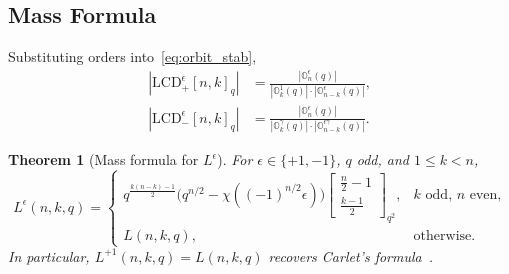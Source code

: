 \documentclass[11pt]{article}
\newcommand{\0}{\mathbf{0}}
\newcommand{\1}{\mathbf{1}}
\theoremstyle{plain}
\newtheorem{theorem}{Theorem}[section]
\theoremstyle{definition}
\theoremstyle{remark}
\begin{document}
\subsection{Mass Formula}

Substituting orders into~\eqref{eq:orbit_stab},
\begin{equation}\label{eq:LB_pm}
\begin{aligned}
|\mathrm{LCD}^\epsilon_+[n,k]_q| &= \frac{|\mathbb{O}_n^\epsilon(q)|}{|\mathbb{O}_k^1(q)| \cdot |\mathbb{O}_{n-k}^{\epsilon}(q)|}, \\
|\mathrm{LCD}^\epsilon_-[n,k]_q| &= \frac{|\mathbb{O}_n^\epsilon(q)|}{|\mathbb{O}_k^\gamma(q)| \cdot |\mathbb{O}_{n-k}^{\epsilon\gamma}(q)|}.
\end{aligned}
\end{equation}

\begin{theorem}[Mass formula for $L^\epsilon$]\label{thm:Lepsilon}
For $\epsilon \in \{+1, -1\}$, $q$ odd, and $1 \leq k < n$,
\[
L^\epsilon(n, k, q) = \begin{cases}
q^{\frac{k(n-k)-1}{2}}\bigl(q^{n/2} - \chi((-1)^{n/2}\epsilon)\bigr)\left[\begin{smallmatrix} \frac{n}{2}-1 \\ \frac{k-1}{2} \end{smallmatrix}\right]_{q^2}, & k \text{ odd, } n \text{ even,} \\[6pt]
L(n, k, q), & \text{otherwise.}
\end{cases}
\]
In particular, $L^{+1}(n, k, q) = L(n, k, q)$ recovers Carlet's formula~\cite[Corollary~32]{carlet2019new}.
\end{theorem}
\end{document}
